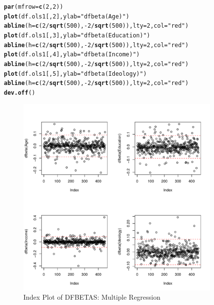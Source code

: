 \documentclass[11pt,openany]{book}\usepackage[]{graphicx}\usepackage[]{color}
\makeatletter
\newcommand{\hlnum}[1]{\textcolor[rgb]{0.686,0.059,0.569}{#1}}%
\newcommand{\hlstr}[1]{\textcolor[rgb]{0.192,0.494,0.8}{#1}}%
\newcommand{\hlopt}[1]{\textcolor[rgb]{0,0,0}{#1}}%
\newcommand{\hlstd}[1]{\textcolor[rgb]{0.345,0.345,0.345}{#1}}%
\newcommand{\hlkwc}[1]{\textcolor[rgb]{0.333,0.667,0.333}{#1}}%
\newcommand{\hlkwd}[1]{\textcolor[rgb]{0.737,0.353,0.396}{\textbf{#1}}}%
\newenvironment{kframe}{%
 \def\at@end@of@kframe{}%
 \ifinner\ifhmode%
  \def\at@end@of@kframe{\end{minipage}}%
  \begin{minipage}{\columnwidth}%
 \fi\fi%
 \def\FrameCommand##1{\hskip\@totalleftmargin \hskip-\fboxsep
 \colorbox{shadecolor}{##1}\hskip-\fboxsep
     \hskip-\linewidth \hskip-\@totalleftmargin \hskip\columnwidth}%
 \MakeFramed {\advance\hsize-\width
   \@totalleftmargin\z@ \linewidth\hsize
   \@setminipage}}%
 {\par\unskip\endMakeFramed%
 \at@end@of@kframe}
\newenvironment{knitrout}{}{} %
\renewenvironment{knitrout}{\begin{singlespace}}{\end{singlespace}}
\makeatother
\begin{document}
\begin{knitrout}
\color{fgcolor}\begin{kframe}
\begin{alltt}
\hlkwd{par}\hlstd{(}\hlkwc{mfrow} \hlstd{=} \hlkwd{c}\hlstd{(}\hlnum{2}\hlstd{,} \hlnum{2}\hlstd{))}
\hlkwd{plot}\hlstd{(df.ols1[,} \hlnum{2}\hlstd{],} \hlkwc{ylab} \hlstd{=} \hlstr{"dfbeta(Age)"}\hlstd{)}
\hlkwd{abline}\hlstd{(}\hlkwc{h} \hlstd{=} \hlkwd{c}\hlstd{(}\hlnum{2}\hlopt{/}\hlkwd{sqrt}\hlstd{(}\hlnum{500}\hlstd{),} \hlopt{-}\hlnum{2}\hlopt{/}\hlkwd{sqrt}\hlstd{(}\hlnum{500}\hlstd{)),} \hlkwc{lty} \hlstd{=} \hlnum{2}\hlstd{,} \hlkwc{col} \hlstd{=} \hlstr{"red"}\hlstd{)}
\hlkwd{plot}\hlstd{(df.ols1[,} \hlnum{3}\hlstd{],} \hlkwc{ylab} \hlstd{=} \hlstr{"dfbeta(Education)"}\hlstd{)}
\hlkwd{abline}\hlstd{(}\hlkwc{h} \hlstd{=} \hlkwd{c}\hlstd{(}\hlnum{2}\hlopt{/}\hlkwd{sqrt}\hlstd{(}\hlnum{500}\hlstd{),} \hlopt{-}\hlnum{2}\hlopt{/}\hlkwd{sqrt}\hlstd{(}\hlnum{500}\hlstd{)),} \hlkwc{lty} \hlstd{=} \hlnum{2}\hlstd{,} \hlkwc{col} \hlstd{=} \hlstr{"red"}\hlstd{)}
\hlkwd{plot}\hlstd{(df.ols1[,} \hlnum{4}\hlstd{],} \hlkwc{ylab} \hlstd{=} \hlstr{"dfbeta(Income)"}\hlstd{)}
\hlkwd{abline}\hlstd{(}\hlkwc{h} \hlstd{=} \hlkwd{c}\hlstd{(}\hlnum{2}\hlopt{/}\hlkwd{sqrt}\hlstd{(}\hlnum{500}\hlstd{),} \hlopt{-}\hlnum{2}\hlopt{/}\hlkwd{sqrt}\hlstd{(}\hlnum{500}\hlstd{)),} \hlkwc{lty} \hlstd{=} \hlnum{2}\hlstd{,} \hlkwc{col} \hlstd{=} \hlstr{"red"}\hlstd{)}
\hlkwd{plot}\hlstd{(df.ols1[,} \hlnum{5}\hlstd{],} \hlkwc{ylab} \hlstd{=} \hlstr{"dfbeta(Ideology)"}\hlstd{)}
\hlkwd{abline}\hlstd{(}\hlkwc{h} \hlstd{=} \hlkwd{c}\hlstd{(}\hlnum{2}\hlopt{/}\hlkwd{sqrt}\hlstd{(}\hlnum{500}\hlstd{),} \hlopt{-}\hlnum{2}\hlopt{/}\hlkwd{sqrt}\hlstd{(}\hlnum{500}\hlstd{)),} \hlkwc{lty} \hlstd{=} \hlnum{2}\hlstd{,} \hlkwc{col} \hlstd{=} \hlstr{"red"}\hlstd{)}
\hlkwd{dev.off}\hlstd{()}
\end{alltt}
\end{kframe}
\end{knitrout}

\begin{figure}
        \centering
        \includegraphics[width=4in]{15_Diagnostics/dfbetas.pdf}%
        \caption{Index Plot of DFBETAS: Multiple  Regression \label{fig:dfbetas}}
\end{figure}        
\end{document}

